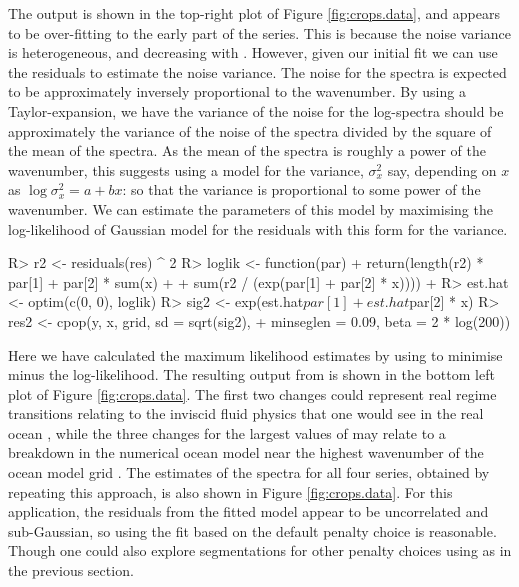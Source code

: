 \documentclass[article]{jss}
\begin{document}
The output is shown in the top-right plot of Figure \ref{fig:crops.data}, and appears to be over-fitting to the early part of the series. This is because the noise variance is heterogeneous, and decreasing with . However, given our initial fit we can use the residuals to estimate the noise variance. The noise for the spectra is expected to be approximately inversely proportional to the wavenumber. By using a Taylor-expansion, we have the variance of the noise for the log-spectra should be approximately the variance of the noise of the spectra divided by the square of the mean of the spectra. As the mean of the spectra is roughly a power of the wavenumber, this suggests using a model for the variance, $\sigma^2_x$ say, depending on $x$ as $\log \sigma^2_x = a + bx$: so that the variance is proportional to some power of the wavenumber. We can estimate the parameters of this model by maximising the log-likelihood of Gaussian model for the residuals with this form for the variance.
\newpage
\begin{CodeChunk}
\begin{CodeInput}
R> r2 <- residuals(res) ^ 2
R> loglik <- function(par) { 
+  return(length(r2) * par[1] + par[2] * sum(x) + 
+          sum(r2 / (exp(par[1] + par[2] * x))))
+ }
R> est.hat <- optim(c(0, 0), loglik)
R> sig2 <- exp(est.hat$par[1] + est.hat$par[2] * x)
R> res2 <- cpop(y, x, grid, sd = sqrt(sig2), 
+               minseglen = 0.09, beta = 2 * log(200))
\end{CodeInput}
\end{CodeChunk}
Here we have calculated the maximum likelihood estimates by using  to minimise minus the log-likelihood. The resulting output from  is shown in the bottom left plot of Figure \ref{fig:crops.data}.  The first two changes could represent real regime transitions relating to the inviscid fluid physics that one would see in the real ocean \cite[see Figure 6a of][]{callies2013interpreting}, while the three changes for the largest values of  may relate to a breakdown in the numerical ocean model near the highest wavenumber of the ocean model grid \cite[]{soufflet2016effective}. The estimates of the spectra for all four series, obtained by repeating this approach, is also shown in Figure \ref{fig:crops.data}. For this application, the residuals from the fitted model appear to be uncorrelated and sub-Gaussian, so using the fit based on the default penalty choice is reasonable. Though one could also explore segmentations for other penalty choices using  as in the previous section.
\end{document}
